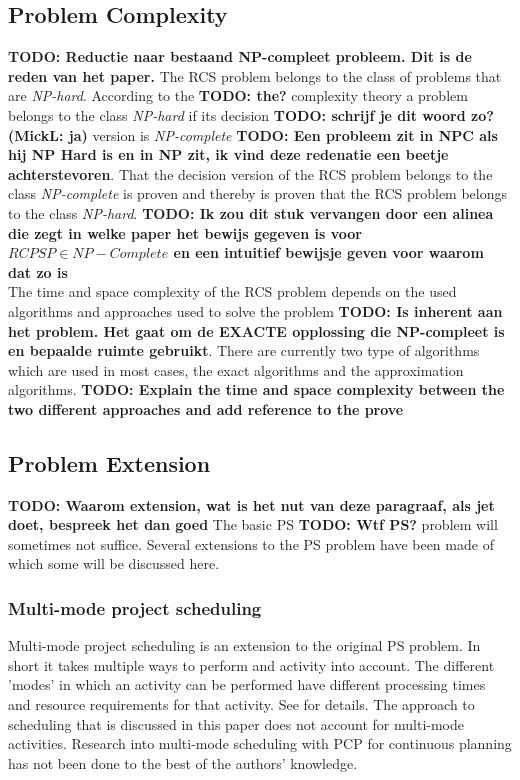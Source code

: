 \documentclass{article}
\newcommand{\TODO}[1]{{\color{red}\textbf{TODO: #1}}}
\begin{document}
\subsection{Problem Complexity}
\TODO{Reductie naar bestaand NP-compleet probleem. Dit is de reden van het paper.}
The RCS problem belongs to the class of problems that are \emph{NP-hard}. According to the \TODO{the?} complexity theory a problem belongs to the class \emph{NP-hard} if its decision \TODO{schrijf je dit woord zo? (MickL: ja)} version is \emph{NP-complete} \TODO{Een probleem zit in NPC als hij NP Hard is en in NP zit, ik vind deze redenatie een beetje achterstevoren}. 
That the decision version of the RCS problem belongs to the class \emph{NP-complete} is proven and thereby is proven that the RCS problem belongs to the class \emph{NP-hard}. 
\TODO{Ik zou dit stuk vervangen door een alinea die zegt in welke paper het bewijs gegeven is voor $RCPSP \in NP-Complete$ en een intuitief bewijsje geven voor waarom dat zo is}\\
The time and space complexity of the RCS problem depends on the used algorithms and approaches used to solve the problem \TODO{Is inherent aan het problem. Het gaat om de EXACTE opplossing die NP-compleet is en bepaalde ruimte gebruikt}. 
There are currently two type of algorithms which are used in most cases, the exact algorithms and the approximation algorithms.
\TODO{Explain the time and space complexity between the two different approaches and add reference to the prove}

\subsection{Problem Extension}\TODO{Waarom extension, wat is het nut van deze paragraaf, als jet doet, bespreek het dan goed}
The basic PS \TODO{Wtf PS?} problem will sometimes not suffice. Several extensions to the PS problem have been made of which some will be discussed here. 

\subsubsection{Multi-mode project scheduling}
Multi-mode project scheduling is an extension to the original PS problem.
In short it takes multiple ways to perform and activity into account.
The different 'modes' in which an activity can be performed have different processing times and resource requirements for that activity.
See \citet{herroelen05} for details.
The approach to scheduling that is discussed in this paper does not account for multi-mode activities.
Research into multi-mode scheduling with PCP for continuous planning has not been done to the best of the authors' knowledge. 
\end{document}
